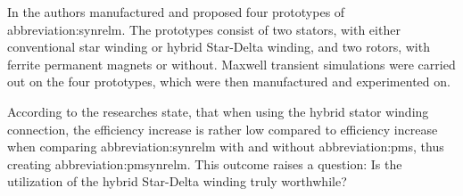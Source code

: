 \documentclass[a4paper, twoside, 11pt]{article}
\begin{document}
        In \cite{ibrahim-permanent-magnet-assisted-synchronous-reluctance-motor-employing-a-hybrid-star-delta-winding-for-high-speed-applicaitons} the authors manufactured and proposed four prototypes of \gls{abbreviation:synrelm}. The prototypes consist of two stators, with either conventional star winding or hybrid Star-Delta winding, and two rotors, with ferrite permanent magnets or without. Maxwell transient simulations were carried out on the four prototypes, which were then manufactured and experimented on.\par
    According to \cite{ibrahim-permanent-magnet-assisted-synchronous-reluctance-motor-employing-a-hybrid-star-delta-winding-for-high-speed-applicaitons} the researches state, that when using the hybrid stator winding connection, the efficiency increase is rather low compared to efficiency increase when comparing \gls{abbreviation:synrelm} with and without \gls{abbreviation:pm}s, thus creating \gls{abbreviation:pmsynrelm}. This outcome raises a question: Is the utilization of the hybrid Star-Delta winding truly worthwhile?\par
\end{document}
